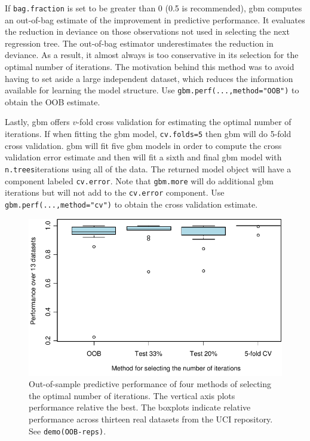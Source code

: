 \documentclass{article}
\begin{document}
If \texttt{bag.fraction} is set to be greater than 0 (0.5 is recommended), gbm computes an out-of-bag estimate of the improvement in predictive performance. It evaluates the reduction in deviance on those observations not used in selecting the next regression tree. The out-of-bag estimator underestimates the reduction in deviance. As a result, it almost always is too conservative in its selection for the optimal number of iterations. The motivation behind this method was to avoid having to set aside a large independent dataset, which reduces the information available for learning the model structure. Use \texttt{gbm.perf(...,method="OOB")} to obtain the OOB estimate.

Lastly, gbm offers $v$-fold cross validation for estimating the optimal number of iterations. If when fitting the gbm model, \texttt{cv.folds=5} then gbm will do 5-fold cross validation. gbm will fit five gbm models in order to compute the cross validation error estimate and then will fit a sixth and final gbm model with \texttt{n.trees}iterations using all of the data. The returned model object will have a component labeled \texttt{cv.error}. Note that \texttt{gbm.more} will do additional gbm iterations but will not add to the \texttt{cv.error} component. Use \texttt{gbm.perf(...,method="cv")} to obtain the cross validation estimate.

\begin{figure}[ht] 
\begin{center} 
\includegraphics[width=5in]{oobperf2} 
\end{center} 
\caption{Out-of-sample predictive performance of four methods of selecting the optimal number of iterations. The vertical axis plots performance relative the best. The boxplots indicate relative performance across thirteen real datasets from the UCI repository. See \texttt{demo(OOB-reps)}.} 
\label{fig:oobperf} 
\end{figure}
\end{document}

